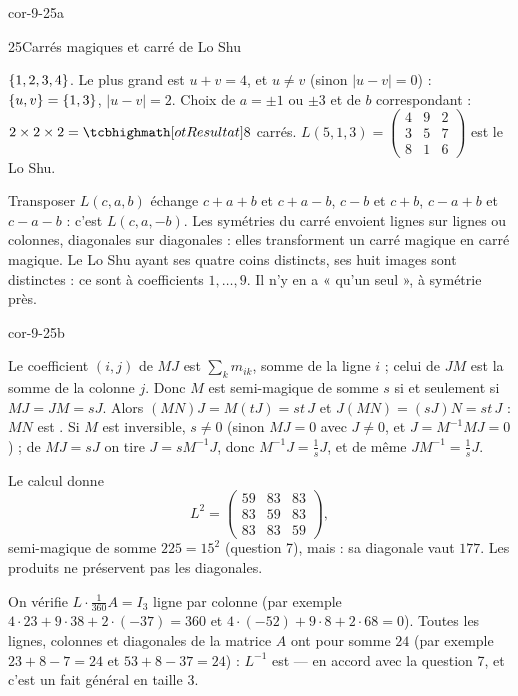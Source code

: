 \begin{blocLivre}{cor-9-25a}
\begin{corrige}{25}{Carrés magiques et carré de Lo Shu}
\begin{questions}[resume]
    $\left\{1,2,3,4\right\}$. Le plus grand est $u+v=4$, et $u\neq v$ (sinon
    $|u-v|=0$) : $\left\{u,v\right\}=\left\{1,3\right\}$, $|u-v|=2$. Choix de $a=\pm1$ ou
    $\pm3$ et de $b$ correspondant : $2\times2\times2=\res{8}$ carrés.
    $L(5,1,3)=\begin{pmatrix}4&9&2\\3&5&7\\8&1&6\end{pmatrix}$ est le Lo Shu.
  \item Transposer $L(c,a,b)$ échange $c+a+b$ et $c+a-b$, $c-b$ et $c+b$,
    $c-a+b$ et $c-a-b$ : c'est $L(c,a,-b)$. Les symétries du carré
    envoient lignes sur lignes ou colonnes, diagonales sur diagonales :
    elles transforment un carré magique en carré magique. Le Lo Shu ayant
    ses quatre coins distincts, ses huit images sont distinctes : ce sont
     à coefficients $1,\dots,9$. Il
    n'y en a « qu'un seul », à symétrie près.
\end{questions}
\end{corrige}
\end{blocLivre}

\begin{blocLivre}{cor-9-25b}
\begin{corrigeSuite}
\begin{questions}[start=7]
  \item Le coefficient $(i,j)$ de $MJ$ est $\sum_k m_{ik}$, somme de la
    ligne $i$ ; celui de $JM$ est la somme de la colonne $j$. Donc $M$ est
    semi-magique de somme $s$ si et seulement si $MJ=JM=sJ$. Alors
    $(MN)J=M(tJ)=st\,J$ et $J(MN)=(sJ)N=st\,J$ : $MN$ est
    . Si $M$ est inversible, $s\neq0$
    (sinon $MJ=0$ avec $J\neq0$, et $J=M^{-1}MJ=0$) ; de $MJ=sJ$ on tire
    $J=sM^{-1}J$, donc $M^{-1}J=\frac1sJ$, et de même $JM^{-1}=\frac1sJ$.
  \item Le calcul donne
    \[
    L^{2}=\begin{pmatrix}59&83&83\\ 83&59&83\\ 83&83&59\end{pmatrix},
    \]
    semi-magique de somme $225=15^{2}$ (question 7), mais
     : sa diagonale vaut $177$. Les produits ne
    préservent pas les diagonales.
  \item On vérifie $L\cdot\frac{1}{360}A=I_3$ ligne par colonne (par
    exemple $4\cdot23+9\cdot38+2\cdot(-37)=360$ et
    $4\cdot(-52)+9\cdot8+2\cdot68=0$). Toutes les lignes, colonnes et
    diagonales de la matrice $A$ ont pour somme $24$ (par exemple
    $23+8-7=24$ et $53+8-37=24$) : $L^{-1}$ est
     — en
    accord avec la question 7, et c'est un fait général en taille $3$.
\end{questions}
\end{corrigeSuite}
\end{blocLivre}
